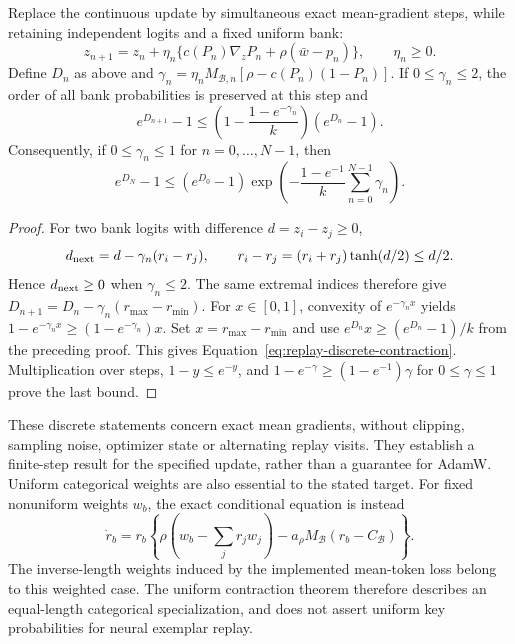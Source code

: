 \begin{proposition}
\enforcehalffinalproseline
\label{prop:replay-discrete-contraction}
Replace the continuous update by simultaneous exact mean-gradient steps,
while retaining independent logits and a fixed uniform bank:
\[
 z_{n+1}=z_n+\eta_n\{c(P_n)\nabla_zP_n+
                         \rho(\bar w-p_n)\},\qquad \eta_n\ge0.
\]
Define $D_n$ as above and
$\gamma_n=\eta_n M_{\mathcal B,n}
 [\rho-c(P_n)(1-P_n)]$.
If $0\le\gamma_n\le2$, the order of all bank probabilities is preserved
at this step and
\begin{equation}
 e^{D_{n+1}}-1\le
 \left(1-\frac{1-e^{-\gamma_n}}{k}\right)(e^{D_n}-1).
 \label{eq:replay-discrete-contraction}
\end{equation}
Consequently, if $0\le\gamma_n\le1$ for $n=0,\ldots,N-1$, then
\[
 e^{D_N}-1\le(e^{D_0}-1)
  \exp\!\left(-\frac{1-e^{-1}}{k}
                    \sum_{n=0}^{N-1}\gamma_n\right).
\]
\end{proposition}

\begin{proof}
\enforcehalffinalproseline
For two bank logits with difference $d=z_i-z_j\ge0$,
\[
 d_{\rm next}=d-\gamma_n(r_i-r_j),\qquad
 r_i-r_j=(r_i+r_j)\tanh(d/2)\le d/2.
\]
Hence $d_{\rm next}\ge0$ when $\gamma_n\le2$. The same extremal indices
therefore give
$D_{n+1}=D_n-\gamma_n(r_{\max}-r_{\min})$.
For $x\in[0,1]$, convexity of $e^{-\gamma_nx}$ yields
$1-e^{-\gamma_nx}\ge(1-e^{-\gamma_n})x$. Set
$x=r_{\max}-r_{\min}$ and use
$e^{D_n}x\ge(e^{D_n}-1)/k$ from the preceding proof. This gives
Equation~\eqref{eq:replay-discrete-contraction}. Multiplication over steps,
$1-y\le e^{-y}$, and
$1-e^{-\gamma}\ge(1-e^{-1})\gamma$ for $0\le\gamma\le1$ prove the last
bound.
\end{proof}

These discrete statements concern exact mean gradients, without clipping,
sampling noise, optimizer state or alternating replay visits. They establish
a finite-step result for the specified update, rather than a guarantee for
AdamW. Uniform categorical weights are also essential to the stated target.
For fixed nonuniform weights $w_b$, the exact conditional equation is instead
\begin{equation}
 \dot r_b=r_b\left\{
   \rho\left(w_b-\sum_jr_jw_j\right)
   -a_\rho M_{\mathcal B}(r_b-C_{\mathcal B})\right\}.
 \label{eq:replay-finite-weighted}
\end{equation}
The inverse-length weights induced by the implemented mean-token loss belong
to this weighted case. The uniform contraction theorem therefore describes
an equal-length categorical specialization, and does not assert uniform key
probabilities for neural exemplar replay.


